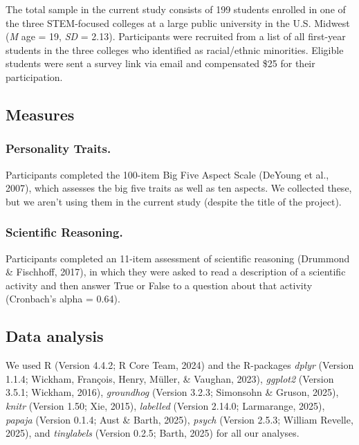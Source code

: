 \documentclass[
  english,
  man,floatsintext]{apa6}
\begin{document}
The total sample in the current study consists of 199 students enrolled in one of the three STEM-focused colleges at a large public university in the U.S. Midwest (\emph{M} age = 19, \emph{SD} = 2.13). Participants were recruited from a list of all first-year students in the three colleges who identified as racial/ethnic minorities. Eligible students were sent a survey link via email and compensated \$25 for their participation.

\subsection{Measures}\label{measures}

\subsubsection{Personality Traits.}\label{personality-traits.}

Participants completed the 100-item Big Five Aspect Scale (DeYoung et al., 2007), which assesses the big five traits as well as ten aspects. We collected these, but we aren't using them in the current study (despite the title of the project).

\subsubsection{Scientific Reasoning.}\label{scientific-reasoning.}

Participants completed an 11-item assessment of scientific reasoning (Drummond \& Fischhoff, 2017), in which they were asked to read a description of a scientific activity and then answer True or False to a question about that activity (Cronbach's alpha = 0.64).

\subsection{Data analysis}\label{data-analysis}

We used R (Version 4.4.2; R Core Team, 2024) and the R-packages \emph{dplyr} (Version 1.1.4; Wickham, François, Henry, Müller, \& Vaughan, 2023), \emph{ggplot2} (Version 3.5.1; Wickham, 2016), \emph{groundhog} (Version 3.2.3; Simonsohn \& Gruson, 2025), \emph{knitr} (Version 1.50; Xie, 2015), \emph{labelled} (Version 2.14.0; Larmarange, 2025), \emph{papaja} (Version 0.1.4; Aust \& Barth, 2025), \emph{psych} (Version 2.5.3; William Revelle, 2025), and \emph{tinylabels} (Version 0.2.5; Barth, 2025) for all our analyses.
\end{document}
